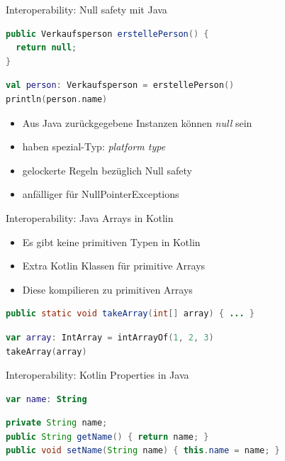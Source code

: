 \documentclass{beamer}
\begin{document}
\begin{frame}[fragile]{Interoperability: Null safety mit Java}
  \begin{lstlisting}[language=Java]
public Verkaufsperson erstellePerson() {
  return null;
}
  \end{lstlisting}
  \pause
  \begin{lstlisting}[language=Kotlin]
val person: Verkaufsperson = erstellePerson()
println(person.name)
  \end{lstlisting}
  \pause
  \begin{itemize}[<+->]
    \item Aus Java zurückgegebene Instanzen können \textit{null} sein
    \item haben spezial-Typ: \textit{platform type}
    \item gelockerte Regeln bezüglich Null safety
    \item anfälliger für NullPointerExceptions
  \end{itemize}
\end{frame}

\begin{frame}[fragile]{Interoperability: Java Arrays in Kotlin}
  \begin{itemize}[<+->]
    \item Es gibt keine primitiven Typen in Kotlin
    \item Extra Kotlin Klassen für primitive Arrays
    \item Diese kompilieren zu primitiven Arrays
  \end{itemize}
  \pause \vspace{1cm}
  \begin{lstlisting}[language=Java]
public static void takeArray(int[] array) { ... }
  \end{lstlisting}
  \pause
  \begin{lstlisting}[language=Kotlin]
var array: IntArray = intArrayOf(1, 2, 3)
takeArray(array)
  \end{lstlisting}
\end{frame}

\begin{frame}[fragile]{Interoperability: Kotlin Properties in Java}
  \begin{lstlisting}[language=Kotlin]
var name: String
    \end{lstlisting}
    \pause
    \begin{lstlisting}[language=Java]
private String name;
public String getName() { return name; }
public void setName(String name) { this.name = name; }
      \end{lstlisting}
\end{frame}
\end{document}
